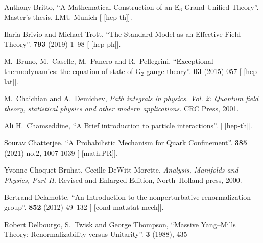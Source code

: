 \begin{thebibliography}{99}
Anthony Britto,
``A Mathematical Construction of an E$_{6}$ Grand Unified Theory''.
Master's thesis, LMU Munich
[ [hep-th]].

Ilaria Brivio and Michael Trott,
``The Standard Model as an Effective Field Theory''.
 \textbf{793} (2019) 1--98
{\tt{}}
[ [hep-ph]].

M.~Bruno, M.~Caselle, M.~Panero and R.~Pellegrini,
``Exceptional thermodynamics: the equation of state of G$_{2}$ gauge theory''.
 \textbf{03} (2015) 057
{\tt{}}
[ [hep-lat]].

M.~Chaichian and A.~Demichev,
\textit{Path integrals in physics. Vol. 2: Quantum field theory, statistical physics and other modern applications}.
CRC Press, 2001.

Ali H.~Chamseddine,
``A Brief introduction to particle interactions''.
[ [hep-th]].

Sourav Chatterjee,
``A Probabilistic Mechanism for Quark Confinement''.
 \textbf{385} (2021) no.2, 1007-1039
{\tt{}}
[ [math.PR]].

Yvonne Choquet-Bruhat, Cecille DeWitt-Morette,
\textit{Analysis, Manifolds and Physics, Part II}.
Revised and Enlarged Edition, North--Holland press, 2000.
  
Bertrand Delamotte,
``An Introduction to the nonperturbative renormalization group''.
 \textbf{852} (2012) 49--132
{\tt{}}
[ [cond-mat.stat-mech]].

Robert Delbourgo, S.~Twisk and George Thompson,
``Massive Yang--Mills Theory: Renormalizability versus Unitarity''.
 \textbf{3} (1988), 435
{\tt{}}


\end{thebibliography}
